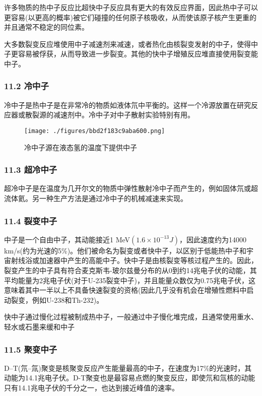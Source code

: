 许多物质的热中子反应比超快中子反应具有更大的有效反应界面，因此热中子可以更容易(以更高的概率)被它们碰撞的任何原子核吸收，从而使该原子核产生更重的并且通常不稳定的同位素。

大多数裂变反应堆使用中子减速剂来减速，或者热化由核裂变发射的中子，使得中子更容易被俘获，从而导致进一步裂变。其他的快中子增殖反应堆直接使用裂变能中子。

\subsubsection{11.2 冷中子}
冷中子是热中子是在非常冷的物质如液体氘中平衡的。这样一个冷源放置在研究反应器或散裂源的减速剂中。冷中子对中子散射实验特别有用。
\begin{figure}[ht]
\centering
\texttt{[image: ./figures/bbd2f183c9aba600.png]}
\caption{冷中子源在液态氢的温度下提供中子} \label{fig_Neutro_7}
\end{figure}

\subsubsection{11.3 超冷中子}
超冷中子是在温度为几开尔文的物质中弹性散射冷中子而产生的，例如固体氘或超流体氦。另一种生产方法是通过冷中子的机械减速来实现。

\subsubsection{11.4 裂变中子}
中子是一个自由中子，其动能接近1 MeV$(1.6\times10^{-13} J)$，因此速度约为14000 km/s(约为光速的5\%)。他们被命名为裂变或者快中子，以区别于低能热中子和宇宙射线浴或加速器中产生的高能中子。快中子是由核裂变等核过程产生的。因此，裂变产生的中子具有符合麦克斯韦-玻尔兹曼分布的从0到约14兆电子伏的动能，其平均能量为2兆电子伏(对于U-235裂变中子)，并且能量众数仅为0.75兆电子伏，这意味着其中一半以上不具备快速裂变的资格(因此几乎没有机会在增殖性燃料中启动裂变，例如U-238和Th-232)。

快中子通过慢化过程被制成热中子，一般通过中子慢化堆完成，且通常使用重水、轻水或石墨来缓和中子

\subsubsection{11.5 聚变中子}
D–T(氘–氚)聚变是核聚变反应产生能量最高的中子，在速度为17\%的光速时，其动能为14.1兆电子伏。D-T聚变也是最容易点燃的聚变反应，即使氘和氚核的动能只有14.1兆电子伏的千分之一，也达到接近峰值的速率。

